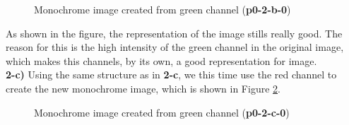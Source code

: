 \documentclass[12pt,a4paper]{article}
\begin{document}
\begin{figure}[!h]
	\centering
	{%
		\setlength{\fboxsep}{1pt}%
		\setlength{\fboxrule}{1pt}%
	}%
	\caption{Monochrome image created from green channel (\textbf{p0-2-b-0})}
	\label{fig:img-green}
\end{figure}

As shown in the figure, the representation of the image stills really good. The reason for this is the high intensity of the green channel in the original image, which makes this channels, by its own, a good representation for image.\\

\textbf{2-c) } Using the same structure as in \textbf{2-c}, we this time use the red channel to create the new monochrome image, which is shown in Figure \ref{fig:img-red}.

\begin{figure}[!h]
	\centering
	{%
		\setlength{\fboxsep}{1pt}%
		\setlength{\fboxrule}{1pt}%
	}%
	\caption{Monochrome image created from green channel (\textbf{p0-2-c-0})}
	\label{fig:img-red}
\end{figure}
\end{document}
